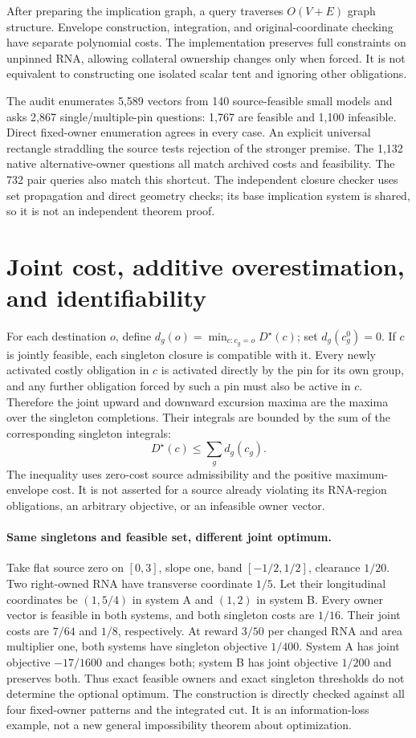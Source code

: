 \documentclass[10pt,letterpaper]{article}
\begin{document}
After preparing the implication graph, a query traverses $O(V+E)$ graph structure. Envelope construction, integration, and original-coordinate checking have separate polynomial costs. The implementation preserves full constraints on unpinned RNA, allowing collateral ownership changes only when forced. It is not equivalent to constructing one isolated scalar tent and ignoring other obligations.

The audit enumerates 5,589 vectors from 140 source-feasible small models and asks 2,867 single/multiple-pin questions: 1,767 are feasible and 1,100 infeasible. Direct fixed-owner enumeration agrees in every case. An explicit universal rectangle straddling the source tests rejection of the stronger premise. The 1,132 native alternative-owner questions all match archived costs and feasibility. The 732 pair queries also match this shortcut. The independent closure checker uses set propagation and direct geometry checks; its base implication system is shared, so it is not an independent theorem proof.

\section{Joint cost, additive overestimation, and identifiability}
For each destination $o$, define $d_g(o)=\min_{c:c_g=o}D^\star(c)$; set $d_g(c_g^0)=0$. If $c$ is jointly feasible, each singleton closure is compatible with it. Every newly activated costly obligation in $c$ is activated directly by the pin for its own group, and any further obligation forced by such a pin must also be active in $c$. Therefore the joint upward and downward excursion maxima are the maxima over the singleton completions. Their integrals are bounded by the sum of the corresponding singleton integrals:
\[
D^\star(c)\le\sum_g d_g(c_g).
\]
The inequality uses zero-cost source admissibility and the positive maximum-envelope cost. It is not asserted for a source already violating its RNA-region obligations, an arbitrary objective, or an infeasible owner vector.

\paragraph{Same singletons and feasible set, different joint optimum.}
Take flat source zero on $[0,3]$, slope one, band $[-1/2,1/2]$, clearance $1/20$. Two right-owned RNA have transverse coordinate $1/5$. Let their longitudinal coordinates be $(1,5/4)$ in system A and $(1,2)$ in system B. Every owner vector is feasible in both systems, and both singleton costs are $1/16$. Their joint costs are $7/64$ and $1/8$, respectively. At reward $3/50$ per changed RNA and area multiplier one, both systems have singleton objective $1/400$. System A has joint objective $-17/1600$ and changes both; system B has joint objective $1/200$ and preserves both. Thus exact feasible owners and exact singleton thresholds do not determine the optional optimum. The construction is directly checked against all four fixed-owner patterns and the integrated cut. It is an information-loss example, not a new general impossibility theorem about optimization.
\end{document}
